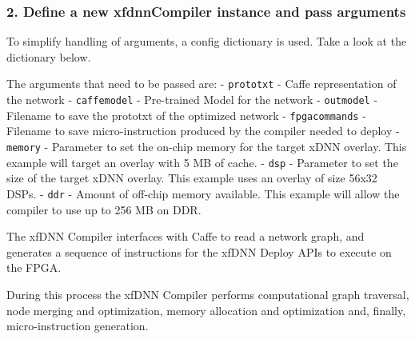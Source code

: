 \documentclass[11pt]{article}
\begin{document}
    \subsubsection{2. Define a new xfdnnCompiler instance and pass
arguments}\label{define-a-new-xfdnncompiler-instance-and-pass-arguments}

To simplify handling of arguments, a config dictionary is used. Take a
look at the dictionary below.

The arguments that need to be passed are: - \texttt{prototxt} - Caffe
representation of the network - \texttt{caffemodel} - Pre-trained Model
for the network - \texttt{outmodel} - Filename to save the prototxt of
the optimized network - \texttt{fpgacommands} - Filename to save
micro-instruction produced by the compiler needed to deploy -
\texttt{memory} - Parameter to set the on-chip memory for the target
xDNN overlay. This example will target an overlay with 5 MB of cache. -
\texttt{dsp} - Parameter to set the size of the target xDNN overlay.
This example uses an overlay of size 56x32 DSPs. - \texttt{ddr} - Amount
of off-chip memory available. This example will allow the compiler to
use up to 256 MB on DDR.

The xfDNN Compiler interfaces with Caffe to read a network graph, and
generates a sequence of instructions for the xfDNN Deploy APIs to
execute on the FPGA.

During this process the xfDNN Compiler performs computational graph
traversal, node merging and optimization, memory allocation and
optimization and, finally, micro-instruction generation.
\end{document}
